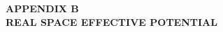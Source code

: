 \clearpage
\doublespacing
\vspace*{\fill} 
\begin{center}
\textbf{APPENDIX B}\label{appendixB}\\
\medskip
\textbf{REAL SPACE EFFECTIVE POTENTIAL}\\
\end{center}
\vspace{7pt}
\vspace*{\fill}
\singlespacing